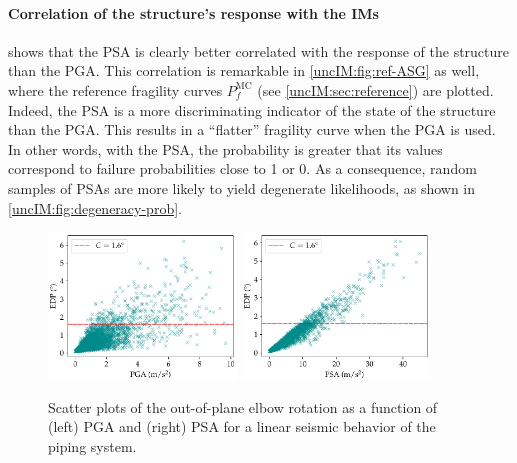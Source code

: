 \paragraph{Correlation of the structure's response with the IMs}
 shows that the PSA is clearly better correlated with the response of the structure than the PGA. 
This correlation is remarkable in \cref{uncIM:fig:ref-ASG} as well, where the reference fragility curves $P_f^{\text{MC}}$ (see \cref{uncIM:sec:reference}) are plotted. 
Indeed, the PSA is a more discriminating indicator of the state of the structure than the PGA. This results in a ``flatter'' fragility curve when the PGA is used. In other words, with the PSA, the probability is greater that its values correspond to failure probabilities close to 1 or 0. 
As a consequence, random samples of PSAs are more likely to yield degenerate likelihoods, as shown in \cref{uncIM:fig:degeneracy-prob}.






    \begin{figure}[!ht]
        \centering
         {\includegraphics[width=5cm]{figures/uncIM/cloud_PGA.pdf}}
         {\includegraphics[width=5cm]{figures/uncIM/cloud_PSA.pdf}}
        \caption{Scatter plots of the out-of-plane elbow rotation as a function of (left) PGA and (right) PSA for a linear seismic behavior of the piping system.}
         \label{uncIM:fig:scatterplots_PSA_PGA}
    \end{figure}

